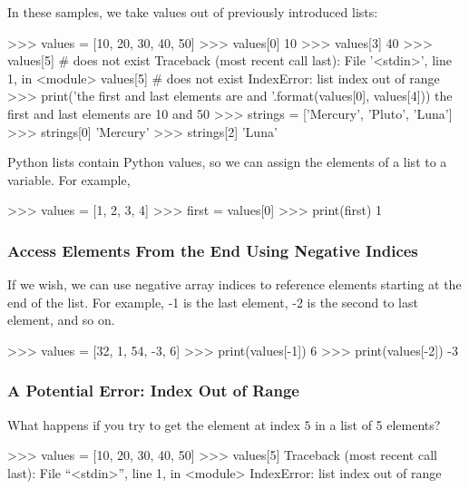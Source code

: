 \documentclass[11pt]{cselabheader}
\begin{document}
In these samples, we take values out of previously introduced lists:

\begin{pyconcode}
>>> values = [10, 20, 30, 40, 50]
>>> values[0]
10
>>> values[3]
40
>>> values[5]  # does not exist
Traceback (most recent call last):
  File '<stdin>', line 1, in <module>
    values[5]  # does not exist
IndexError: list index out of range
>>> print('the first and last elements are {} and {}'.format(values[0], values[4]))
the first and last elements are 10 and 50
>>> strings = ['Mercury', 'Pluto', 'Luna']
>>> strings[0]
'Mercury'
>>> strings[2]
'Luna'

\end{pyconcode}

Python lists contain Python values, so we can assign the elements of a list
to a variable. For example,

\begin{pyconcode}
>>> values = [1, 2, 3, 4]
>>> first = values[0]
>>> print(first)
1

\end{pyconcode}

\subsubsection{Access Elements From the End Using Negative Indices}
If we wish, we can use negative array indices to reference elements starting at
the end of the list. For example, -1 is the last element, -2 is the second to
last element, and so on.

\begin{pyconcode}
>>> values = [32, 1, 54, -3, 6]
>>> print(values[-1])
6
>>> print(values[-2])
-3

\end{pyconcode}

\subsubsection{A Potential Error: Index Out of Range}

What happens if you try to get the element at index $5$ in a
list of 5 elements?

\begin{pyconcode}
>>> values = [10, 20, 30, 40, 50]
>>> values[5]
Traceback (most recent call last):
  File ``<stdin>'', line 1, in <module>
IndexError: list index out of range

\end{pyconcode}
\end{document}
